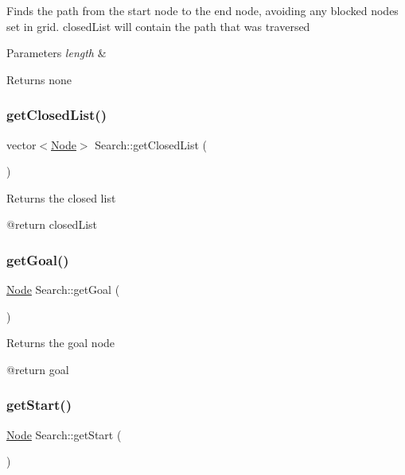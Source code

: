 Finds the path from the start node to the end node, avoiding any blocked nodes set in grid. closed\+List will contain the path that was traversed


\begin{DoxyParams}{Parameters}
{\em length} & \\
\hline
\end{DoxyParams}
\begin{DoxyReturn}{Returns}
none 
\end{DoxyReturn}
\mbox{\label{classSearch_a89084e77e24858c6edba6dd7b67b37ee}} 
\subsubsection{\texorpdfstring{get\+Closed\+List()}{getClosedList()}}
{\footnotesize\ttfamily vector$<$\hyperlink{structNode}{Node}$>$ Search\+::get\+Closed\+List (\begin{DoxyParamCaption}{ }\end{DoxyParamCaption})\hspace{0.3cm}{\ttfamily [inline]}}

Returns the closed list \begin{DoxyVerb}@return closedList\end{DoxyVerb}
 \mbox{\label{classSearch_a3a6f267df8e921ccb7feab65ad990948}} 
\subsubsection{\texorpdfstring{get\+Goal()}{getGoal()}}
{\footnotesize\ttfamily \hyperlink{structNode}{Node} Search\+::get\+Goal (\begin{DoxyParamCaption}{ }\end{DoxyParamCaption})\hspace{0.3cm}{\ttfamily [inline]}}

Returns the goal node \begin{DoxyVerb}@return goal\end{DoxyVerb}
 \mbox{\label{classSearch_a4c59b1eff090896d91582d3cbe85c0f0}} 
\subsubsection{\texorpdfstring{get\+Start()}{getStart()}}
{\footnotesize\ttfamily \hyperlink{structNode}{Node} Search\+::get\+Start (\begin{DoxyParamCaption}{ }\end{DoxyParamCaption})\hspace{0.3cm}{\ttfamily [inline]}}

